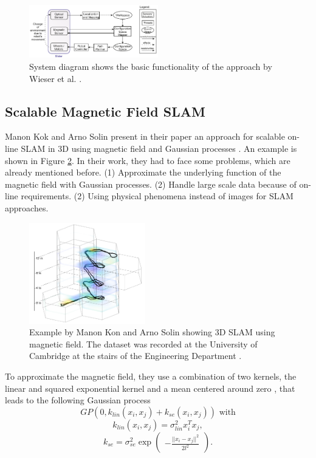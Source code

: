 \begin{figure}[h!]
	\centering
	\includegraphics[width=0.5\textwidth]{images/wieser_system.png}
	\caption{
            System diagram shows the basic functionality of the approach by Wieser et al. 
            \cite{wieser_slam_indoor_2014}.
        }
	\label{fig:wieser_system}
\end{figure}

\subsection{Scalable Magnetic Field SLAM}
Manon Kok and Arno Solin present in their paper an approach for scalable on-line SLAM in 3D using
magnetic field and Gaussian processes \cite{kok_scalable_2018}. An example is shown
in Figure \ref{fig:kok_3d}. In their work, they had to face some problems, which are already mentioned 
before. (1) Approximate the underlying function of the magnetic field with Gaussian processes. (2) Handle 
large scale data because of on-line requirements. (2) Using physical phenomena instead of images for 
SLAM approaches.

\begin{figure}[h!]
	\centering
	\includegraphics[width=0.45\textwidth]{images/kok_3d.png}
	\caption{
        Example by Manon Kon and Arno Solin showing 3D SLAM using magnetic field.
        The dataset was recorded at the University of Cambridge at the stairs of
        the Engineering Department \cite{kok_scalable_2018}.
        }
	\label{fig:kok_3d}
\end{figure}

To approximate the magnetic field, they use a combination of two kernels, the linear and squared
exponential kernel and a mean centered around zero \cite{kok_scalable_2018}, that leads to the 
following Gaussian process
$$
GP(0, k_{lin}(x_i, x_j) + k_{se}(x_i, x_j)) \text{ with}
$$
$$
k_{lin}(x_i, x_j) = \sigma_{lin}^2 x_i^T x_j, 
$$
$$
k_{se} = \sigma_{se}^2 \exp 
\begin{pmatrix}
    -\frac{||x_i - x_j||^2}{2l^2}
\end{pmatrix}\text{.}
$$

